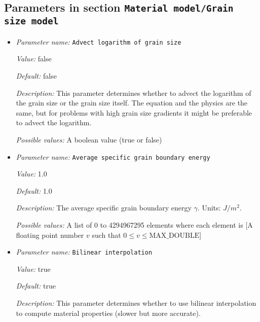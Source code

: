 \subsection{Parameters in section \tt Material model/Grain size model}
\label{parameters:Material_20model/Grain_20size_20model}

\begin{itemize}
\item {\it Parameter name:} {\tt Advect logarithm of grain size}
\label{parameters:Material model/Grain size model/Advect logarithm of grain size}


{\it Value:} false


{\it Default:} false


{\it Description:} This parameter determines whether to advect the logarithm of the grain size or the grain size itself. The equation and the physics are the same, but for problems with high grain size gradients it might be preferable to advect the logarithm. 


{\it Possible values:} A boolean value (true or false)
\item {\it Parameter name:} {\tt Average specific grain boundary energy}
\label{parameters:Material model/Grain size model/Average specific grain boundary energy}


{\it Value:} 1.0


{\it Default:} 1.0


{\it Description:} The average specific grain boundary energy $\gamma$. Units: $J/m^2$.


{\it Possible values:} A list of 0 to 4294967295 elements where each element is [A floating point number $v$ such that $0 \leq v \leq \text{MAX\_DOUBLE}$]
\item {\it Parameter name:} {\tt Bilinear interpolation}
\label{parameters:Material model/Grain size model/Bilinear interpolation}


{\it Value:} true


{\it Default:} true


{\it Description:} This parameter determines whether to use bilinear interpolation to compute material properties (slower but more accurate).



\end{itemize}
